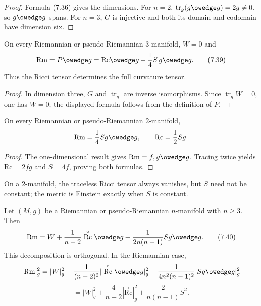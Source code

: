 \begin{proof}
\sketch
Formula (7.36) gives the dimensions.  For $n=2$,
$\operatorname{tr}_g(g\owedge g)=2g\ne0$, so $g\owedge g$ spans.  For $n=3$,
$G$ is injective and both its domain and codomain have dimension six.
\end{proof}

\begin{corollary}
\label{cor:ricci-determines-curvature-dim3}

On every Riemannian or pseudo-Riemannian $3$-manifold, $W=0$ and
\begin{equation}
\mathrm{Rm}=P\owedge g
=\mathrm{Rc}\owedge g-\frac14S\,g\owedge g. \tag{7.39}
\end{equation}
Thus the Ricci tensor determines the full curvature tensor.
\end{corollary}

\begin{proof}
\sketch
In dimension three, $G$ and $\operatorname{tr}_g$ are inverse isomorphisms.
Since $\operatorname{tr}_gW=0$, one has $W=0$; the displayed formula follows
from the definition of $P$.
\end{proof}

\begin{corollary}
\label{cor:curvature-tensor-dim-2}

On every Riemannian or pseudo-Riemannian $2$-manifold,
\[
\mathrm{Rm}=\frac14Sg\owedge g,
\qquad
\mathrm{Rc}=\frac12Sg.
\]
\end{corollary}

\begin{proof}
\sketch
The one-dimensional result gives $\mathrm{Rm}=f,g\owedge g$.  Tracing twice
yields $\mathrm{Rc}=2fg$ and $S=4f$, proving both formulas.
\end{proof}

On a $2$-manifold, the traceless Ricci tensor always vanishes, but $S$ need
not be constant; the metric is Einstein exactly when $S$ is constant.

\begin{proposition}
\label{prop:ricci-decomposition}

Let $(M,g)$ be a Riemannian or pseudo-Riemannian $n$-manifold with $n\geq3$.
Then
\begin{equation}
\mathrm{Rm}=W+\frac1{n-2}\stackrel{\circ}{\mathrm{Rc}}\owedge g
+\frac1{2n(n-1)}Sg\owedge g. \tag{7.40}
\end{equation}
This decomposition is orthogonal.  In the Riemannian case,
\[
|\mathrm{Rm}|_g^2=|W|_g^2
+\frac1{(n-2)^2}|\stackrel{\circ}{\mathrm{Rc}}\owedge g|_g^2
+\frac1{4n^2(n-1)^2}|Sg\owedge g|_g^2
\]
\begin{equation}
=|W|_g^2+\frac4{n-2}|\stackrel{\circ}{\mathrm{Rc}}|_g^2
+\frac2{n(n-1)}S^2. \tag{7.41}
\end{equation}
\end{proposition}

